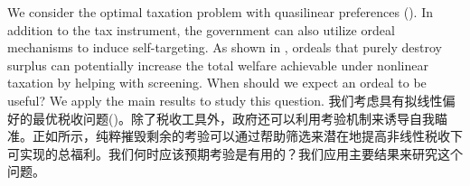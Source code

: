 \documentclass[12pt,letterpaper]{article}
\newenvironment{original}{\color{black}\noindent}{}
\newenvironment{translation}{\color{blue}\noindent}{}
\theoremstyle{plain}
\theoremstyle{definition}
\theoremstyle{remark}
\renewcommand{\1}{\mathds{1}}
\theoremstyle{definition}
\begin{document}
\begin{original}
We consider the optimal taxation problem with quasilinear preferences (\citealt{diamond1998optimal}). In addition to the tax instrument, the government can also utilize ordeal mechanisms to induce self-targeting. As shown in \citet{Nichols1982b}, ordeals that purely destroy surplus can potentially increase the total welfare achievable under nonlinear taxation by helping with screening. When should we expect an ordeal to be useful?
We apply the main results to study this question.
\end{original}
\begin{translation}
我们考虑具有拟线性偏好的最优税收问题(\citealt{diamond1998optimal})。除了税收工具外，政府还可以利用考验机制来诱导自我瞄准。正如\citet{Nichols1982b}所示，纯粹摧毁剩余的考验可以通过帮助筛选来潜在地提高非线性税收下可实现的总福利。我们何时应该预期考验是有用的？我们应用主要结果来研究这个问题。
\end{translation}
\end{document}
